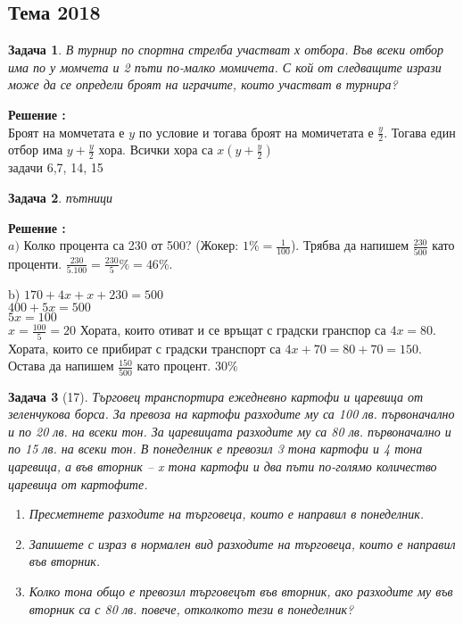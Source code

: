 \documentclass{article}
\theoremstyle{plain}
\newtheorem*{problem*}{Задача}
\newcounter{solution}
\newcommand\solution{%
	\stepcounter{solution}%
	\textbf{Решение :}\\%
}
\begin{document}
\subsection{Тема 2018}
\begin{problem*}
	В турнир по спортна стрелба участват х отбора. Във всеки отбор има по у момчета и 2 пъти
	по-малко момичета. С кой от следващите изрази може да се определи броят на играчите, които
	участват в турнира?
\end{problem*}
\solution Броят на момчетата е $y$ по условие и тогава броят на момичетата е $\frac{y}{2}$. Тогава един отбор има $y + \frac{y}{2}$ хора. Всички хора са $x(y+\frac{y}{2}) $ \\

задачи 6,7, 14, 15

\begin{problem*}
	пътници
\end{problem*}

\solution
$a )$ Колко процента са 230 от 500? (Жокер: $1\% = \frac{1}{100} $). Трябва да напишем  $\frac{230}{500}$ като проценти. $\frac{230}{5.100} = \frac{230}{5}\% = 46\%$.

b) $170 + 4x + x+ 230 = 500 $ \\
$ 400 + 5x = 500 $ \\ $5x = 100 $ \\
$x = \frac{100}{5} = 20  $
Хората, които отиват и се връщат с градски гранспор са $4x = 80 $. Хората, които се прибират с градски транспорт са $4x +70 = 80 + 70 = 150.$ Остава да напишем $\frac{150}{500} $ като процент. 
$30\% $

\begin{problem*}[17]
	Търговец транспортира ежедневно картофи и царевица от зеленчукова борса. За превоза на
	картофи разходите му са 100 лв. първоначално и по 20 лв. на всеки тон. За царевицата
	разходите му са 80 лв. първоначално и по 15 лв. на всеки тон. В понеделник е превозил 3 тона
	картофи и 4 тона царевица, а във вторник – x тона картофи и два пъти по-голямо количество
	царевица от картофите.
	\begin{enumerate}
		\item Пресметнете разходите на търговеца, които е направил в понеделник.
		\item Запишете с израз в нормален вид разходите на търговеца, които е направил във вторник.
		\item Колко тона общо е превозил търговецът във вторник, ако разходите му във вторник са с 80
		лв. повече, отколкото тези в понеделник?
	\end{enumerate}
\end{problem*}
\end{document}
